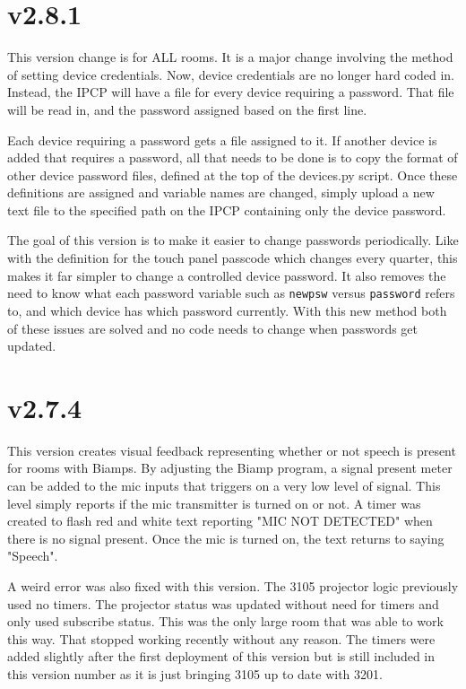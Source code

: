 \documentclass{article}
\begin{document}
\section*{v2.8.1}

This version change is for ALL rooms. It is a major change involving the method of setting device credentials. Now, device credentials are no longer hard coded in. Instead, the IPCP will have a file for every device requiring a password. That file will be read in, and the password assigned based on the first line. 

Each device requiring a password gets a file assigned to it. If another device is added that requires a password, all that needs to be done is to copy the format of other device password files, defined at the top of the devices.py script. Once these definitions are assigned and variable names are changed, simply upload a new text file to the specified path on the IPCP containing only the device password.  

The goal of this version is to make it easier to change passwords periodically. Like with the definition for the touch panel passcode which changes every quarter, this makes it far simpler to change a controlled device password. It also removes the need to know what each password variable such as \lstinline|newpsw| versus \lstinline|password| refers to, and which device has which password currently. With this new method both of these issues are solved and no code needs to change when passwords get updated. 

\section*{v2.7.4} 

This version creates visual feedback representing whether or not speech is present for rooms with Biamps. By adjusting the Biamp program, a signal present meter can be added to the mic inputs that triggers on a very low level of signal. This level simply reports if the mic transmitter is turned on or not. A timer was created to flash red and white text reporting "MIC NOT DETECTED" when there is no signal present. Once the mic is turned on, the text returns to saying "Speech". 

A weird error was also fixed with this version. The 3105 projector logic previously used no timers. The projector status was updated without need for timers and only used subscribe status. This was the only large room that was able to work this way. That stopped working recently without any reason. The timers were added slightly after the first deployment of this version but is still included in this version number as it is just bringing 3105 up to date with 3201.
\end{document}
